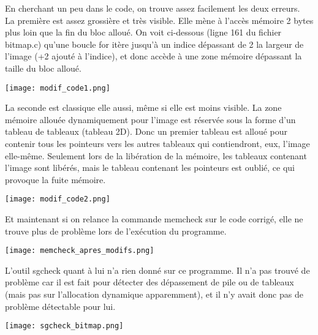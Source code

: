 En cherchant un peu dans le code, on trouve assez facilement les deux erreurs.\\

La première est assez grossière et très visible. Elle mène à l'accès mémoire 2 bytes plus loin que la fin du bloc alloué. On voit ci-dessous (ligne 161 du fichier bitmap.c) qu'une boucle for itère jusqu'à un indice dépassant de 2 la largeur de l'image (+2 ajouté à l'indice), et donc accède à une zone mémoire dépassant la taille du bloc alloué.
\begin{center} 
\hspace{15cm}
\texttt{[image: modif\_code1.png]}
\end{center}
\vspace{0.5cm}

La seconde est classique elle aussi, même si elle est moins visible. La zone mémoire allouée dynamiquement pour l'image est réservée sous la forme d'un tableau de tableaux (tableau 2D). Donc un premier tableau est alloué pour contenir tous les pointeurs vers les autres tableaux qui contiendront, eux, l'image elle-même. Seulement lors de la libération de la mémoire, les tableaux contenant l'image sont libérés, mais le tableau contenant les pointeurs est oublié, ce qui provoque la fuite mémoire.
\begin{center} 
\hspace{15cm}
\texttt{[image: modif\_code2.png]}
\end{center}
\vspace{0.5cm}

Et maintenant si on relance la commande memcheck sur le code corrigé, elle ne trouve plus de problème lors de l'exécution du programme.
\begin{center} 
\hspace{15cm}
\texttt{[image: memcheck\_apres\_modifs.png]}
\end{center}
\vspace{0.5cm}

L'outil sgcheck quant à lui n'a rien donné sur ce programme. Il n'a pas trouvé de problème car il est fait pour détecter des dépassement de pile ou de tableaux (mais pas sur l'allocation dynamique apparemment), et il n'y avait donc pas de problème détectable pour lui.
\begin{center} 
\hspace{15cm}
\texttt{[image: sgcheck\_bitmap.png]}
\end{center}
\vspace{0.5cm}


